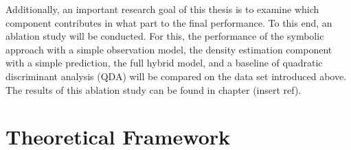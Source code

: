 \documentclass[11pt,titlepage,oneside,openany]{book}
\newtheorem{definition}{Definition}
\newtheorem{proposition}{Proposition}
\begin{document}
Additionally, an important research goal of this thesis is to examine which component contributes in what part to the final performance. To this end, an ablation study will be conducted. For this, the performance of the symbolic approach with a simple observation model, the density estimation component with a simple prediction, the full hybrid model, and a baseline of quadratic discriminant analysis (QDA) will be compared on the data set introduced above. The results of this ablation study can be found in chapter (insert ref).

 
 



\chapter{Theoretical Framework}
\label{cha:theory}



\end{document}
